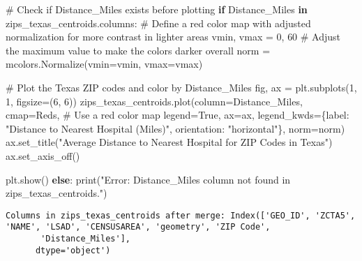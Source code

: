 \documentclass[
  letterpaper,
  DIV=11,
  numbers=noendperiod]{scrartcl}
\newenvironment{Shaded}{\begin{snugshade}}{\end{snugshade}}
\newcommand{\BuiltInTok}[1]{\textcolor[rgb]{0.00,0.23,0.31}{#1}}
\newcommand{\CommentTok}[1]{\textcolor[rgb]{0.37,0.37,0.37}{#1}}
\newcommand{\ControlFlowTok}[1]{\textcolor[rgb]{0.00,0.23,0.31}{\textbf{#1}}}
\newcommand{\DecValTok}[1]{\textcolor[rgb]{0.68,0.00,0.00}{#1}}
\newcommand{\KeywordTok}[1]{\textcolor[rgb]{0.00,0.23,0.31}{\textbf{#1}}}
\newcommand{\NormalTok}[1]{\textcolor[rgb]{0.00,0.23,0.31}{#1}}
\newcommand{\OperatorTok}[1]{\textcolor[rgb]{0.37,0.37,0.37}{#1}}
\newcommand{\StringTok}[1]{\textcolor[rgb]{0.13,0.47,0.30}{#1}}
\newcommand{\VariableTok}[1]{\textcolor[rgb]{0.07,0.07,0.07}{#1}}
\begin{document}
\begin{Shaded}
\begin{Highlighting}[]
\CommentTok{\# Check if \textquotesingle{}Distance\_Miles\textquotesingle{} exists before plotting}
\ControlFlowTok{if} \StringTok{\textquotesingle{}Distance\_Miles\textquotesingle{}} \KeywordTok{in}\NormalTok{ zips\_texas\_centroids.columns:}
    \CommentTok{\# Define a red color map with adjusted normalization for more contrast in lighter areas}
\NormalTok{    vmin, vmax }\OperatorTok{=} \DecValTok{0}\NormalTok{, }\DecValTok{60}  \CommentTok{\# Adjust the maximum value to make the colors darker overall}
\NormalTok{    norm }\OperatorTok{=}\NormalTok{ mcolors.Normalize(vmin}\OperatorTok{=}\NormalTok{vmin, vmax}\OperatorTok{=}\NormalTok{vmax)}

    \CommentTok{\# Plot the Texas ZIP codes and color by \textquotesingle{}Distance\_Miles\textquotesingle{}}
\NormalTok{    fig, ax }\OperatorTok{=}\NormalTok{ plt.subplots(}\DecValTok{1}\NormalTok{, }\DecValTok{1}\NormalTok{, figsize}\OperatorTok{=}\NormalTok{(}\DecValTok{6}\NormalTok{, }\DecValTok{6}\NormalTok{))}
\NormalTok{    zips\_texas\_centroids.plot(column}\OperatorTok{=}\StringTok{\textquotesingle{}Distance\_Miles\textquotesingle{}}\NormalTok{, }
\NormalTok{                              cmap}\OperatorTok{=}\StringTok{\textquotesingle{}Reds\textquotesingle{}}\NormalTok{,  }\CommentTok{\# Use a red color map}
\NormalTok{                              legend}\OperatorTok{=}\VariableTok{True}\NormalTok{, }
\NormalTok{                              ax}\OperatorTok{=}\NormalTok{ax,}
\NormalTok{                              legend\_kwds}\OperatorTok{=}\NormalTok{\{}\StringTok{\textquotesingle{}label\textquotesingle{}}\NormalTok{: }\StringTok{"Distance to Nearest Hospital (Miles)"}\NormalTok{, }\StringTok{\textquotesingle{}orientation\textquotesingle{}}\NormalTok{: }\StringTok{"horizontal"}\NormalTok{\},}
\NormalTok{                              norm}\OperatorTok{=}\NormalTok{norm)}
\NormalTok{    ax.set\_title(}\StringTok{"Average Distance to Nearest Hospital for ZIP Codes in Texas"}\NormalTok{)}
\NormalTok{    ax.set\_axis\_off()}

\NormalTok{    plt.show()}
\ControlFlowTok{else}\NormalTok{:}
    \BuiltInTok{print}\NormalTok{(}\StringTok{"Error: \textquotesingle{}Distance\_Miles\textquotesingle{} column not found in zips\_texas\_centroids."}\NormalTok{)}
\end{Highlighting}
\end{Shaded}

\begin{verbatim}
Columns in zips_texas_centroids after merge: Index(['GEO_ID', 'ZCTA5', 'NAME', 'LSAD', 'CENSUSAREA', 'geometry', 'ZIP Code',
       'Distance_Miles'],
      dtype='object')
\end{verbatim}
\end{document}
